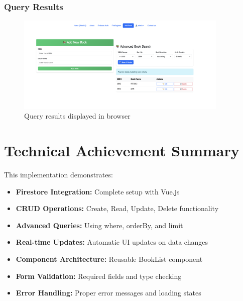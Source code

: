 \documentclass[11pt,a4paper]{article}
\begin{document}
\subsubsection{Query Results}
 \begin{figure}[H]
     \centering
     \includegraphics[width=0.9\textwidth]{query_results.png}
     \caption{Query results displayed in browser}
     \label{fig:query_results}
 \end{figure}

\section{Technical Achievement Summary}

This implementation demonstrates:
\begin{itemize}
    \item \textbf{Firestore Integration:} Complete setup with Vue.js
    \item \textbf{CRUD Operations:} Create, Read, Update, Delete functionality
    \item \textbf{Advanced Queries:} Using where, orderBy, and limit
    \item \textbf{Real-time Updates:} Automatic UI updates on data changes
    \item \textbf{Component Architecture:} Reusable BookList component
    \item \textbf{Form Validation:} Required fields and type checking
    \item \textbf{Error Handling:} Proper error messages and loading states
\end{itemize}
\end{document}
